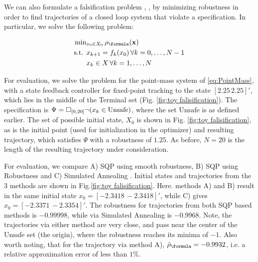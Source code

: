 We can also formulate a falsification problem \cite{AbbasATVA11_LinFalsification}, \cite{AbbasF_HybridSA12}, \cite{Deshmukh15_IterativeApproaches} by minimizing robustness in order to find trajectories of a closed loop system that violate a specification. In particular, we solve the following problem:

\begin{subequations}
\label{eq:falsification}
\begin{align}
\text{min}&_{x_0 \in X_0 } \, \rob_{\formula}(\sstraj) \nonumber \\
\text{s.t. } & x_{k+1} = f_k(x_0) \, \forall k=0,\dotsc,N-1 \\
&  x_{k} \in X \, \forall k=1,\dotsc,N
\end{align}
\end{subequations}

For evaluation, we solve the problem for the point-mass system of \eqref{eq:PointMass}, with a state feedback controller for fixed-point tracking to the state $[2.25\,2.25]'$, which lies in the middle of the Terminal set (Fig. \ref{fig:toy falisification}). The specification is $\Psi=\square_{[0,20]} \neg (x_k \in \text{Unsafe})$, where the set $\text{Unsafe}$ is as defined earlier. The set of possible initial state, $X_0$ is shown in Fig. \ref{fig:toy falisification}, as is the initial point (used for initialization in the optimizer) and resulting trajectory, which satisfies $\Psi$ with a robustness of $1.25$. As before, $N=20$ is the length of the resulting trajectory under consideration.

For evaluation, we compare A) SQP using smooth robustness, B) SQP using Robustness and C) Simulated Annealing \cite{SABOOK}. Initial states and trajectories from the 3 methods are shown in Fig.\ref{fig:toy falisification}. Here. methods A) and B) result in the same initial state $x_0=[-2.3418\, -2.3418]'$, while C) gives $x_0=[-2.3371\, -2.3354]'$. The robustness for trajectories from both SQP based methods is $-0.99998$, while via Simulated Annealing is $-0.9968$. Note, the trajectories via either method are very close, and pass near the center of the $\text{Unsafe}$ set (the origin), where the robustness reaches its minima of $-1$. Also worth noting, that for the trajectory via method A), $\srob_{\formula}=-0.9932$, i.e. a relative approximation error of less than $1\%$.

